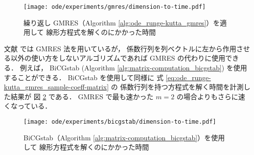 \begin{figure}[tp]
    \centering
    \texttt{[image: ode/experiments/gmres/dimension-to-time.pdf]}
    \caption{繰り返し GMRES（Algorithm \ref{alg:ode_runge-kutta_gmres}）を適用して%
        線形方程式を解くのにかかった時間}
    \label{fig:ode_runge-kutta_gmres_subspace-dimension-to-processing-time}
\end{figure}

文献 \cite{Blom2016, Blom2013} では GMRES 法を用いているが，
係数行列を列ベクトルに左から作用させる以外の使い方をしないアルゴリズムであれば
GMRES の代わりに使用できる．
例えば，
BiCGstab (Algorithm \ref{alg:matrix-computation_bicgstab})
を使用することができる．
BiCGstab を使用して同様に
式 \eqref{eq:ode_runge-kutta_gmres_sample-coeff-matrix} の
係数行列を持つ方程式を解く時間を計測した結果が
図 \ref{fig:ode_runge-kutta_bicgstab_subspace-dimension-to-processing-time} である．
GMRES で最も速かった $m=2$ の場合よりもさらに速くなっている．

\begin{figure}[tp]
    \centering
    \texttt{[image: ode/experiments/bicgstab/dimension-to-time.pdf]}
    \caption{BiCGstab（Algorithm \ref{alg:matrix-computation_bicgstab}）を使用して%
        線形方程式を解くのにかかった時間}
    \label{fig:ode_runge-kutta_bicgstab_subspace-dimension-to-processing-time}
\end{figure}

\clearpage
